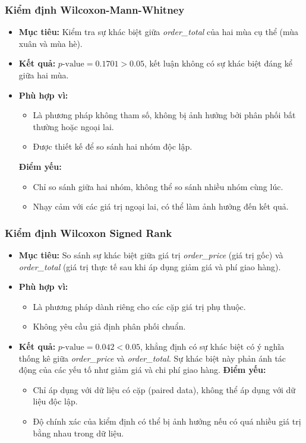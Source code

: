 \subsubsection{Kiểm định Wilcoxon-Mann-Whitney}
\begin{itemize}
    \item \textbf{Mục tiêu:}  
    Kiểm tra sự khác biệt giữa \textit{order\_total} của hai mùa cụ thể (mùa xuân và mùa hè).

    \item \textbf{Kết quả:}  
    $p\text{-value} = 0.1701 > 0.05$, kết luận không có sự khác biệt đáng kể giữa hai mùa.
    \item \textbf{Phù hợp vì:}  
    \begin{itemize}
        \item Là phương pháp không tham số, không bị ảnh hưởng bởi phân phối bất thường hoặc ngoại lai.
        \item Được thiết kế để so sánh hai nhóm độc lập.
    \end{itemize}

\textbf{Điểm yếu:}
\begin{itemize}
    \item Chỉ so sánh giữa hai nhóm, không thể so sánh nhiều nhóm cùng lúc.
    \item Nhạy cảm với các giá trị ngoại lai, có thể làm ảnh hưởng đến kết quả.
\end{itemize}

\end{itemize}

\subsubsection{Kiểm định Wilcoxon Signed Rank}
\begin{itemize}
    \item \textbf{Mục tiêu:}  
    So sánh sự khác biệt giữa giá trị \textit{order\_price} (giá trị gốc) và \textit{order\_total} (giá trị thực tế sau khi áp dụng giảm giá và phí giao hàng).

    \item \textbf{Phù hợp vì:}  
    \begin{itemize}
        \item Là phương pháp dành riêng cho các cặp giá trị phụ thuộc.
        \item Không yêu cầu giả định phân phối chuẩn.
    \end{itemize}
    \item \textbf{Kết quả:}  
    $p\text{-value} = 0.042 < 0.05$, khẳng định có sự khác biệt có ý nghĩa thống kê giữa \textit{order\_price} và \textit{order\_total}. Sự khác biệt này phản ánh tác động của các yếu tố như giảm giá và chi phí giao hàng.
\textbf{Điểm yếu:}
\begin{itemize}
    \item Chỉ áp dụng với dữ liệu có cặp (paired data), không thể áp dụng với dữ liệu độc lập.
    \item Độ chính xác của kiểm định có thể bị ảnh hưởng nếu có quá nhiều giá trị bằng nhau trong dữ liệu.
\end{itemize}
\end{itemize}

